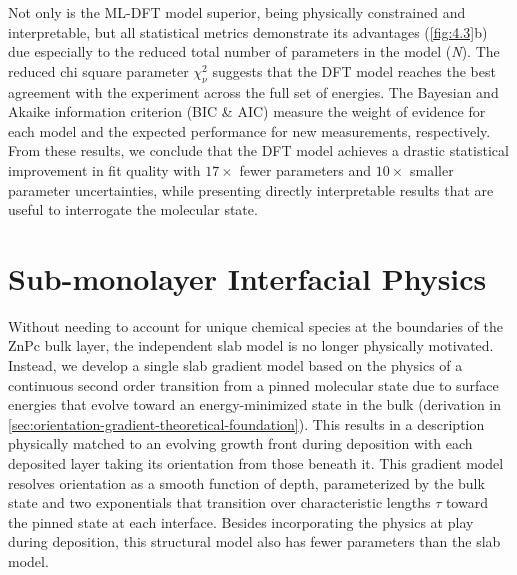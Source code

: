Not only is the ML-DFT model superior, being physically constrained and interpretable, but all statistical metrics demonstrate its advantages (\cref{fig:4.3}b) due especially to the reduced total number of parameters in the model (\emph{N}). The reduced chi square parameter \(\chi_{\nu}^{2}\) suggests that the DFT model reaches the best agreement with the experiment across the full set of energies. The Bayesian and Akaike information criterion (BIC \& AIC) measure the weight of evidence for each model and the expected performance for new measurements, respectively. From these results, we conclude that the DFT model achieves a drastic statistical improvement in fit quality with \(17\times\) fewer parameters and \(10\times\) smaller parameter uncertainties, while presenting directly interpretable results that are useful to interrogate the molecular state.

\section{Sub-monolayer Interfacial Physics}\label{sec:sub-monolayer-interfacial-physics}

Without needing to account for unique chemical species at the boundaries of the ZnPc bulk layer, the independent slab model is no longer physically motivated. Instead, we develop a single slab gradient model based on the physics of a continuous second order transition from a pinned molecular state due to surface energies that evolve toward an energy-minimized state in the bulk (derivation in \cref{sec:orientation-gradient-theoretical-foundation}). This results in a description physically matched to an evolving growth front during deposition with each deposited layer taking its orientation from those beneath it. This gradient model resolves orientation as a smooth function of depth, parameterized by the bulk state and two exponentials that transition over characteristic lengths \(\tau\) toward the pinned state at each interface. Besides incorporating the physics at play during deposition, this structural model also has fewer parameters than the slab model.

